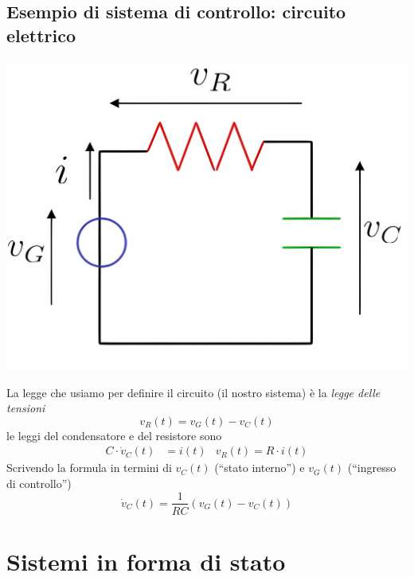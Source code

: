 \documentclass{article}
\numberwithin{equation}{subsection}
\let\oldsection\section%
\renewcommand{\section}{%
  \renewcommand{\theequation}{\thesection.\arabic{equation}}%
  \oldsection}%
\let\oldsubsection\subsection%
\renewcommand{\subsection}{%
  \renewcommand{\theequation}{\thesubsection.\arabic{equation}}%
  \oldsubsection}%
\begin{document}
\subsection{Esempio di sistema di controllo: circuito elettrico} \label{Circuito elettrico}
\begin{center}
    \includegraphics[scale=0.2]{Images/Es_cirucito_elettrico.png}
\end{center}
La legge che usiamo per definire il circuito (il nostro sistema) è la \textit{legge delle tensioni}
\begin{equation}
    v_R (t) = v_G (t) - v_C(t)
\end{equation} 
le leggi del condensatore e del resistore sono 
\begin{align*}
    C \cdot  \dot v_C (t) &= i(t) & v_R (t) = R\cdot i(t)
\end{align*}
Scrivendo la formula in termini di $v_C (t)$ (“stato interno”) e $v_G (t)$ (“ingresso di controllo”)
\begin{equation}
    \dot v_C (t) = \frac{1}{RC} \left(v_G (t) - v_C (t) \right)
\end{equation}




\section{Sistemi in forma di stato}
\end{document}
